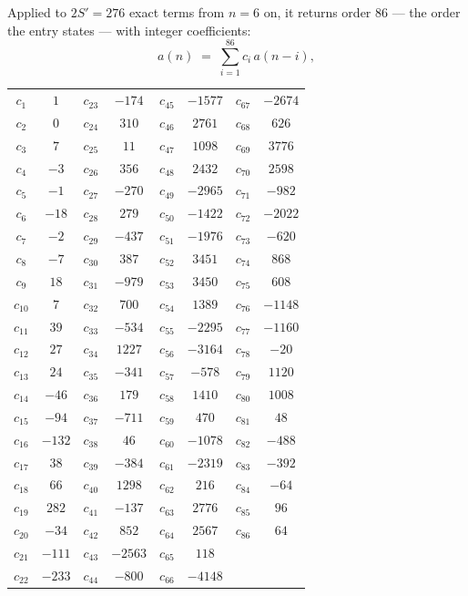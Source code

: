 \documentclass[11pt,a4paper]{article}
\theoremstyle{plain}
\theoremstyle{definition}
\begin{document}
Applied to $2S'=276$ exact terms from $n=6$ on, it returns order $86$ --- the
order the entry states --- with integer coefficients:
\[
a(n)\;=\;\sum_{i=1}^{86}c_i\,a(n-i),
\]
\begin{center}\small
\begin{tabular}{cccccccc}
$c_{1}$ & $1$ & $c_{23}$ & $-174$ & $c_{45}$ & $-1577$ & $c_{67}$ & $-2674$ \\
$c_{2}$ & $0$ & $c_{24}$ & $310$ & $c_{46}$ & $2761$ & $c_{68}$ & $626$ \\
$c_{3}$ & $7$ & $c_{25}$ & $11$ & $c_{47}$ & $1098$ & $c_{69}$ & $3776$ \\
$c_{4}$ & $-3$ & $c_{26}$ & $356$ & $c_{48}$ & $2432$ & $c_{70}$ & $2598$ \\
$c_{5}$ & $-1$ & $c_{27}$ & $-270$ & $c_{49}$ & $-2965$ & $c_{71}$ & $-982$ \\
$c_{6}$ & $-18$ & $c_{28}$ & $279$ & $c_{50}$ & $-1422$ & $c_{72}$ & $-2022$ \\
$c_{7}$ & $-2$ & $c_{29}$ & $-437$ & $c_{51}$ & $-1976$ & $c_{73}$ & $-620$ \\
$c_{8}$ & $-7$ & $c_{30}$ & $387$ & $c_{52}$ & $3451$ & $c_{74}$ & $868$ \\
$c_{9}$ & $18$ & $c_{31}$ & $-979$ & $c_{53}$ & $3450$ & $c_{75}$ & $608$ \\
$c_{10}$ & $7$ & $c_{32}$ & $700$ & $c_{54}$ & $1389$ & $c_{76}$ & $-1148$ \\
$c_{11}$ & $39$ & $c_{33}$ & $-534$ & $c_{55}$ & $-2295$ & $c_{77}$ & $-1160$ \\
$c_{12}$ & $27$ & $c_{34}$ & $1227$ & $c_{56}$ & $-3164$ & $c_{78}$ & $-20$ \\
$c_{13}$ & $24$ & $c_{35}$ & $-341$ & $c_{57}$ & $-578$ & $c_{79}$ & $1120$ \\
$c_{14}$ & $-46$ & $c_{36}$ & $179$ & $c_{58}$ & $1410$ & $c_{80}$ & $1008$ \\
$c_{15}$ & $-94$ & $c_{37}$ & $-711$ & $c_{59}$ & $470$ & $c_{81}$ & $48$ \\
$c_{16}$ & $-132$ & $c_{38}$ & $46$ & $c_{60}$ & $-1078$ & $c_{82}$ & $-488$ \\
$c_{17}$ & $38$ & $c_{39}$ & $-384$ & $c_{61}$ & $-2319$ & $c_{83}$ & $-392$ \\
$c_{18}$ & $66$ & $c_{40}$ & $1298$ & $c_{62}$ & $216$ & $c_{84}$ & $-64$ \\
$c_{19}$ & $282$ & $c_{41}$ & $-137$ & $c_{63}$ & $2776$ & $c_{85}$ & $96$ \\
$c_{20}$ & $-34$ & $c_{42}$ & $852$ & $c_{64}$ & $2567$ & $c_{86}$ & $64$ \\
$c_{21}$ & $-111$ & $c_{43}$ & $-2563$ & $c_{65}$ & $118$ &  &  \\
$c_{22}$ & $-233$ & $c_{44}$ & $-800$ & $c_{66}$ & $-4148$ &  &  \\
\end{tabular}
\end{center}
\end{document}
